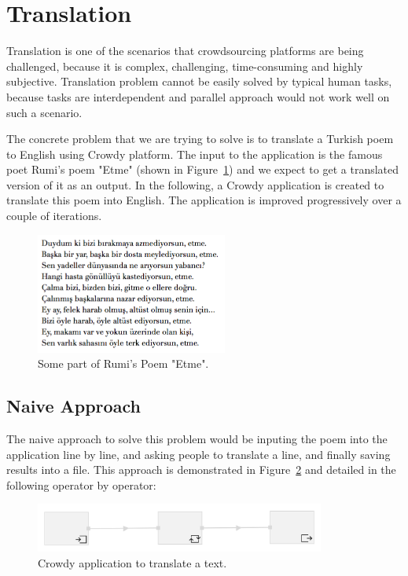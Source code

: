 \newpage
\section{Translation}
Translation is one of the scenarios that crowdsourcing platforms are being challenged, because it is complex, challenging, time-consuming and highly subjective. Translation problem cannot be easily solved by typical human tasks, because tasks are interdependent and parallel approach would not work well on such a scenario.

The concrete problem that we are trying to solve is to translate a Turkish poem to English using Crowdy platform. The input to the application is the famous poet Rumi's poem "Etme" (shown in Figure~\ref{fig:scenario2.poem}) and we expect to get a translated version of it as an output. In the following, a Crowdy application  is created to translate this poem into English. The application is improved progressively over a couple of iterations.

\begin{figure}[ht]
	\centering
	\includegraphics[height=150px]{figures/scenarios/poem.png}
	\caption{Some part of Rumi's Poem "Etme".}
	\label{fig:scenario2.poem}
\end{figure}

\subsection{Naive Approach}
The naive approach to solve this problem would be inputing the poem into the application line by line, and asking people to translate a line, and finally saving results into a file. This approach is demonstrated in Figure~\ref{fig:scenario2} and detailed in the following operator by operator:

\begin{figure}[ht]
	\centering
	\includegraphics[width=0.85\textwidth]{figures/scenarios/naive.png}
	\caption{Crowdy application to translate a text.}
	\label{fig:scenario2}
\end{figure}

